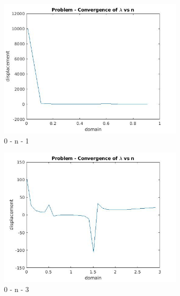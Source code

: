 \documentclass[idxtotoc,hyperref,openany]{labbook} %
\begin{document}
\begin{figure}[h!]
	\centering
	\begin{subfigure}[h!]{0.4\textwidth}
		\includegraphics[width=\textwidth]{setTwo.jpg}
		\caption{0 - n - 1}
		\label{fig:setTwo.jpg}
	\end{subfigure}
	\begin{subfigure}[h!]{0.4\textwidth}
		\includegraphics[width=\textwidth]{setThree.jpg}
		\caption{0 - n - 3}
		\label{fig:setThree.jpg}
	\end{subfigure}
	\begin{subfigure}[h!]{0.4\textwidth}

\end{subfigure}
\end{figure}
\end{document}
